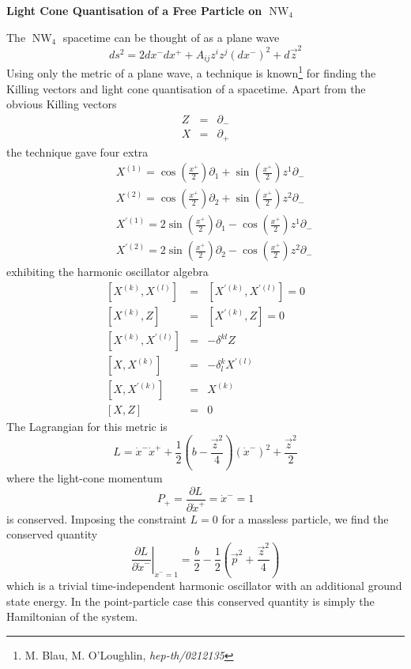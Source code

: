 \documentclass[14pt, a4paper, titlepage]{slides}
\DeclareMathOperator{\NW}{NW}
\newcommand{\cb}[2]{\left[ {#1} , {#2} \right]}
\newcommand{\lb}{\left(}
\newcommand{\rb}{\right)}
\begin{document}
\textbf{Light Cone Quantisation of a Free Particle on $\NW_4$}

The $\NW_4$ spacetime can be thought of as a plane wave
\begin{equation*}
  ds^2 = 2dx^-dx^+ + A_{ij}z^iz^j(dx^-)^2 + d\vec{z}^2
\end{equation*}
Using only the metric of a plane wave, a technique is known\footnote{M. Blau,
  M. O'Loughlin, {\it hep-th/0212135}} for finding the Killing vectors and light
cone quantisation of a spacetime. Apart from the obvious Killing vectors
\begin{eqnarray*}
  Z &=& \partial_-\\
  X &=& \partial_+
\end{eqnarray*}
the technique gave four extra
\begin{eqnarray*}
  &&X^{(1)}=\cos{\lb\frac{x^+}{2}\rb}\partial_1+
  \sin{\lb\frac{x^+}{2}\rb}z^1\partial_- \nonumber \\
  &&X^{(2)}=\cos{\lb\frac{x^+}{2}\rb}\partial_2+
  \sin{\lb\frac{x^+}{2}\rb}z^2\partial_- \nonumber \\
  &&X^{\prime(1)}=2\sin{\lb\frac{x^+}{2}\rb}\partial_1-
  \cos{\lb\frac{x^+}{2}\rb}z^1\partial_- \nonumber \\
  &&X^{\prime(2)}=2\sin{\lb\frac{x^+}{2}\rb}\partial_2-
  \cos{\lb\frac{x^+}{2}\rb}z^2\partial_-
\end{eqnarray*}
exhibiting the harmonic oscillator algebra
\begin{eqnarray*}
  \cb{X^{(k)}}{X^{(l)}}&=&\cb{X^{\prime(k)}}{X^{\prime(l)}}=0 \nonumber \\
  \cb{X^{(k)}}{Z}&=&\cb{X^{\prime(k)}}{Z}=0 \nonumber \\
  \cb{X^{(k)}}{X^{\prime(l)}}&=&-\delta^{kl}Z \nonumber \\
  \cb{X}{X^{(k)}}&=&-\delta^k_l X^{\prime(l)} \nonumber \\
  \cb{X}{X^{\prime(k)}}&=&X^{(k)} \nonumber \\
  \cb{X}{Z}&=&0
\end{eqnarray*}
The Lagrangian for this metric is
\begin{equation*}
  L=\dot{x}^-\dot{x}^+
  +\frac{1}{2}\lb b-\frac{\vec{z}^2}{4}\rb\lb\dot{x}^-\rb^2 +\frac{\vec{z}^2}{2}
\end{equation*}
where the light-cone momentum
\begin{equation*}
  P_+=\frac{\partial L}{\partial \dot{x}^+}=\dot{x}^-=1
\end{equation*}
is conserved. Imposing the constraint $L=0$ for a massless particle, we find the
conserved quantity
\begin{equation*}
  \left. \frac{\partial L}{\partial \dot{x}^-} \right|_{\dot{x}^-=1}
  =\frac{b}{2}-\frac{1}{2}\lb \vec{p}^2 + \frac{\vec{z}^2}{4} \rb
\end{equation*}
which is a trivial time-independent harmonic oscillator with an additional
ground state energy. In the point-particle case this conserved quantity is
simply the Hamiltonian of the system.
\end{document}
